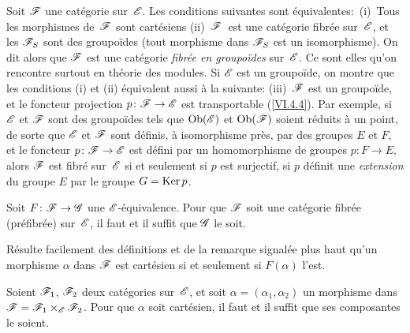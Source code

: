 \begin{remarquesstar}
Soit $\cal{F}$ une cat\'egorie sur~$\cal{E}$. Les conditions
suivantes sont \'equivalentes:~(i)~Tous les morphismes de~$\cal{F}$
sont cart\'esiens (ii)~$\cal{F}$~est une cat\'egorie fibr\'ee
sur~$\cal{E}$, et les $\cal{F}_S$ sont des groupo\"ides
(\ie tout morphisme dans $\cal{F}_S$ est un isomorphisme). On dit
alors que $\cal{F}$ est une cat\'egorie \emph{fibrée en
groupoïdes}
sur~$\cal{E}$. Ce sont elles qu'on rencontre surtout en \og th\'eorie
des modules\fg. Si $\cal{E}$ est un groupo\"ide, on montre que les
conditions (i) et (ii) \'equivalent aussi \`a la suivante:
(iii)~$\cal{F}$ est un groupo\"ide, et le foncteur projection
$p\colon \cal{F}\to\cal{E}$ est transportable (\cf \ref{VI.4.4}). Par
exemple, si $\cal{E}$ et $\cal{F}$ sont des groupo\"ides tels que
$\Ob(\cal{E})$ et $\Ob(\cal{F})$
soient r\'eduits \`a un point, de sorte que $\cal{E}$ et $\cal{F}$
sont d\'efinis, \`a isomorphisme pr\`es, par des groupes $E$ et
$F$, et le foncteur $p\colon \cal{F}\to\cal{E}$ est d\'efini par un
homomorphisme de groupes $p\colon F\to E$, alors $\cal{F}$ est
fibr\'e sur~$\cal{E}$ si et seulement si $p$ est surjectif, \ie si
$p$ d\'efinit une \emph{extension} du groupe $E$ par le groupe $G =
\operatorname{Ker} p$.
\end{remarquesstar}

\begin{proposition}
\label{VI.6.2}
Soit $F \colon \cal{F} \to \cal{G}$ une
$\cal{E}$-\'equivalence. Pour que $\cal{F}$ soit une cat\'egorie
fibr\'ee (\resp pr\'efibr\'ee) sur~$\cal{E}$, il faut et il
suffit que $\cal{G}$ le soit.
\end{proposition}

R\'esulte facilement des d\'efinitions et de la remarque
signal\'ee plus haut qu'un morphisme
$\alpha$
dans $\cal{F}$ est cart\'esien si et seulement si $F(\alpha)$ l'est.

\begin{proposition}
\label{VI.6.3}
Soient $\cal{F}_1$, $\cal{F}_2$ deux cat\'egories sur~$\cal{E}$, et
soit $\alpha = (\alpha_1,\alpha_2)$ un morphisme dans
$\cal{F}=\cal{F}_1 \times_{\cal{E}} \cal{F}_2$. Pour que $\alpha$ soit
cart\'esien, il faut et il suffit que ses composantes le soient.
\end{proposition}

